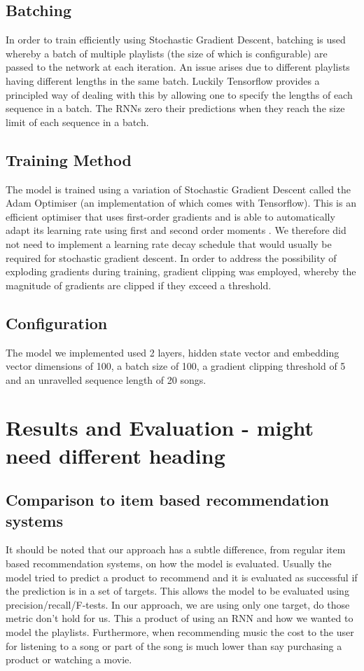 \documentclass{article} %
\begin{document}
\subsection{Batching}
In order to train efficiently using Stochastic Gradient Descent, batching is used whereby a batch of multiple playlists (the size of which is configurable) are passed to the network at each iteration. An issue arises due to different playlists having different lengths in the same batch. Luckily Tensorflow provides a principled way of dealing with this by allowing one to specify the lengths of each sequence in a batch. The RNNs zero their predictions when they reach the size limit of each sequence in a batch. 

\subsection{Training Method}
The model is trained using a variation of Stochastic Gradient Descent called the Adam Optimiser (an implementation of which comes with Tensorflow). This is an efficient optimiser that uses first-order gradients and is able to automatically adapt its learning rate using first and second order moments \cite{Adams}. We therefore did not need to implement a learning rate decay schedule that would usually be required for stochastic gradient descent. In order to address the possibility of exploding gradients during training, gradient clipping was employed, whereby the magnitude of gradients are clipped if they exceed a threshold. 

\subsection{Configuration}
The model we implemented used 2 layers, hidden state vector and embedding vector dimensions of 100, a batch size of 100, a gradient clipping threshold of 5 and an unravelled sequence length of 20 songs. 

\section{Results and Evaluation - might need different heading}
\subsection{Comparison to item based recommendation systems}
It should be noted that our approach has a subtle difference, from regular item based recommendation systems, on how the model is evaluated. Usually the model tried to predict a product to recommend and it is evaluated as successful if the prediction is in a set of targets. This allows the model to be evaluated using precision/recall/F-tests. In our approach, we are using only one target, do those metric don't hold for us. This a product of using an RNN and how we wanted to model the playlists. Furthermore, when recommending music the cost to the user for listening to a song or part of the song is much lower than say purchasing a product or watching a movie. 
\end{document}
